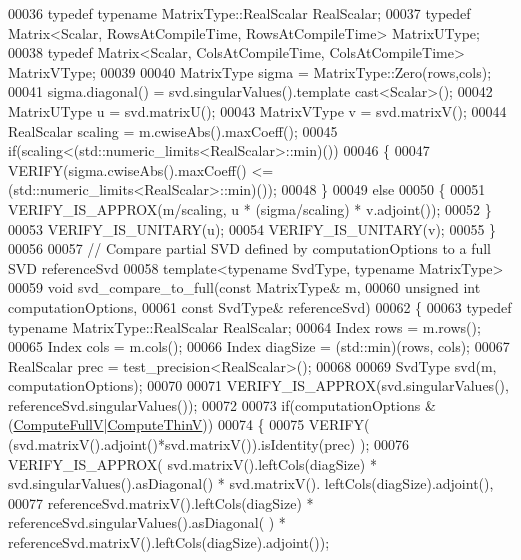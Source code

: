 \begin{DoxyCode}
00036   \textcolor{keyword}{typedef} \textcolor{keyword}{typename} MatrixType::RealScalar RealScalar;
00037   \textcolor{keyword}{typedef} Matrix<Scalar, RowsAtCompileTime, RowsAtCompileTime> MatrixUType;
00038   \textcolor{keyword}{typedef} Matrix<Scalar, ColsAtCompileTime, ColsAtCompileTime> MatrixVType;
00039 
00040   MatrixType sigma = MatrixType::Zero(rows,cols);
00041   sigma.diagonal() = svd.singularValues().template cast<Scalar>();
00042   MatrixUType u = svd.matrixU();
00043   MatrixVType v = svd.matrixV();
00044   RealScalar scaling = m.cwiseAbs().maxCoeff();
00045   \textcolor{keywordflow}{if}(scaling<(std::numeric\_limits<RealScalar>::min)())
00046   \{
00047     VERIFY(sigma.cwiseAbs().maxCoeff() <= (std::numeric\_limits<RealScalar>::min)());
00048   \}
00049   \textcolor{keywordflow}{else}
00050   \{
00051     VERIFY\_IS\_APPROX(m/scaling, u * (sigma/scaling) * v.adjoint());
00052   \}
00053   VERIFY\_IS\_UNITARY(u);
00054   VERIFY\_IS\_UNITARY(v);
00055 \}
00056 
00057 \textcolor{comment}{// Compare partial SVD defined by computationOptions to a full SVD referenceSvd}
00058 \textcolor{keyword}{template}<\textcolor{keyword}{typename} SvdType, \textcolor{keyword}{typename} MatrixType>
00059 \textcolor{keywordtype}{void} svd\_compare\_to\_full(\textcolor{keyword}{const} MatrixType& m,
00060                          \textcolor{keywordtype}{unsigned} \textcolor{keywordtype}{int} computationOptions,
00061                          \textcolor{keyword}{const} SvdType& referenceSvd)
00062 \{
00063   \textcolor{keyword}{typedef} \textcolor{keyword}{typename} MatrixType::RealScalar RealScalar;
00064   Index rows = m.rows();
00065   Index cols = m.cols();
00066   Index diagSize = (std::min)(rows, cols);
00067   RealScalar prec = test\_precision<RealScalar>();
00068 
00069   SvdType svd(m, computationOptions);
00070 
00071   VERIFY\_IS\_APPROX(svd.singularValues(), referenceSvd.singularValues());
00072   
00073   \textcolor{keywordflow}{if}(computationOptions & (\hyperlink{group__enums_ggae3e239fb70022eb8747994cf5d68b4a9a52c6f7e80bbf9a42297c88f700245b51}{ComputeFullV}|\hyperlink{group__enums_ggae3e239fb70022eb8747994cf5d68b4a9a1055e53fa95c8ae04a07ebb72cfafd95}{ComputeThinV}))
00074   \{
00075     VERIFY( (svd.matrixV().adjoint()*svd.matrixV()).isIdentity(prec) );
00076     VERIFY\_IS\_APPROX( svd.matrixV().leftCols(diagSize) * svd.singularValues().asDiagonal() * svd.matrixV().
      leftCols(diagSize).adjoint(),
00077                       referenceSvd.matrixV().leftCols(diagSize) * referenceSvd.singularValues().asDiagonal(
      ) * referenceSvd.matrixV().leftCols(diagSize).adjoint());

\end{DoxyCode}
